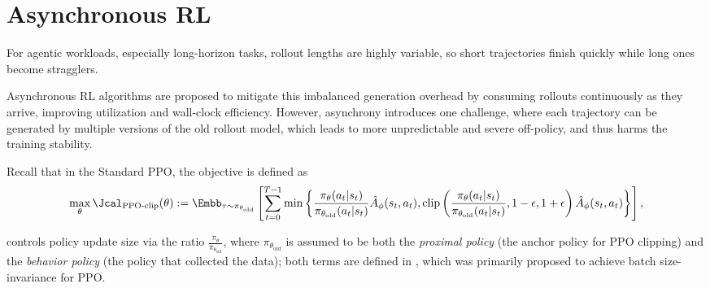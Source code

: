 \part{Asynchronous RL}
For agentic workloads, especially long-horizon tasks, rollout lengths are highly variable, so short trajectories finish quickly while long ones become stragglers.

Asynchronous RL algorithms are proposed to mitigate this imbalanced generation overhead by consuming rollouts continuously as they arrive, improving utilization and wall-clock efficiency. However, asynchrony introduces one challenge, where each trajectory can be generated by multiple versions of the old rollout model, which leads to more unpredictable and severe off-policy, and thus harms the training stability.

Recall that in the Standard PPO, the objective is defined as
\begin{align*}
     \max_{\theta} \Jcal_{\text{PPO-clip}}(\theta):= \Embb_{\tau\sim \pi_{\theta_{\text{old}}}}\left[ \sum_{t=0}^{T-1}  \min\left\{\frac{\pi_{\theta}(a_t|s_t)}{\pi_{\theta_{\text{old}}}(a_t|s_t)}\hat A_\phi(s_t,a_t), \operatorname{clip}\left(\frac{\pi_{\theta}(a_t|s_t)}{\pi_{\theta_{\text{old}}}(a_t|s_t)}, 1-\epsilon, 1+\epsilon\right)\hat A_\phi(s_t,a_t)\right\}\right],
\end{align*}

controls policy update size via the ratio $\frac{\pi_{\theta}}{\pi_{\theta_{\text{old}}}}$, where $\pi_{\theta_{\text{old}}}$ is assumed to be both the \textit{proximal policy} (the anchor policy for PPO clipping) and the \textit{behavior policy} (the policy that collected the data); both terms are defined in \citep{hilton2022batchsizeinvariancepolicyoptimization}, which was primarily proposed to achieve batch size-invariance for PPO.

